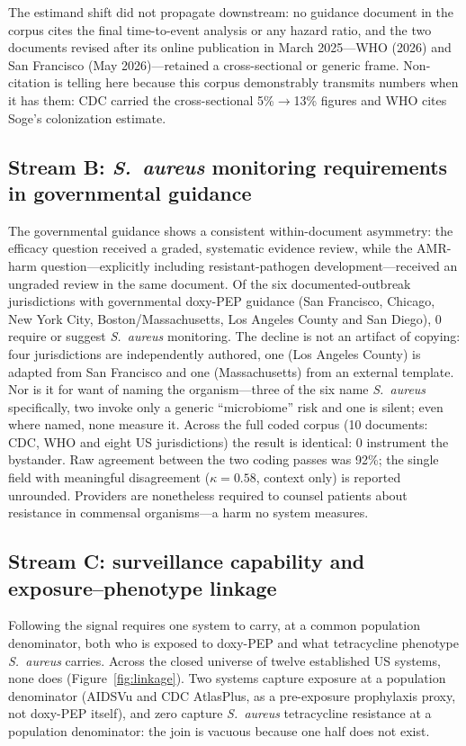 \documentclass[12pt,a4paper]{article}
\newcommand{\sa}{\emph{S.~aureus}}
\begin{document}
The estimand shift did not propagate downstream: no guidance document in the
corpus cites the final time-to-event analysis or any hazard ratio, and the two
documents revised after its online publication in March 2025---WHO (2026) and San
Francisco (May 2026)---retained a cross-sectional or generic frame. Non-citation
is telling here because this corpus demonstrably transmits numbers when it has
them: CDC carried the cross-sectional 5\%$\rightarrow$13\% figures and WHO cites
Soge's colonization estimate.\cite{soge2025}

\subsection*{Stream B: \sa{} monitoring requirements in governmental guidance}
The governmental guidance shows a consistent within-document asymmetry: the
efficacy question received a graded, systematic evidence review, while the
AMR-harm question---explicitly including resistant-pathogen development---received
an ungraded review in the same document. Of the six documented-outbreak
jurisdictions with governmental doxy-PEP guidance (San Francisco, Chicago, New
York City, Boston/Massachusetts, Los Angeles County and San Diego), 0 require or
suggest \sa{} monitoring. The decline is not an artifact of copying: four
jurisdictions are independently authored, one (Los Angeles County) is adapted
from San Francisco and one (Massachusetts) from an external template. Nor is it
for want of naming the organism---three of the six name \sa{} specifically, two
invoke only a generic ``microbiome'' risk and one is silent; even where named,
none measure it. Across the full coded corpus (10 documents: CDC, WHO and eight
US jurisdictions) the result is identical: 0 instrument the bystander. Raw
agreement between the two coding passes was 92\%; the single field with meaningful
disagreement ($\kappa=0.58$, context only) is reported unrounded. Providers are nonetheless required to counsel patients about
resistance in commensal organisms---a harm no system measures.

\subsection*{Stream C: surveillance capability and exposure--phenotype linkage}
Following the signal requires one system to carry, at a common population
denominator, both who is exposed to doxy-PEP and what tetracycline phenotype \sa{}
carries. Across the closed universe of twelve established US systems, none does
(Figure~\ref{fig:linkage}). Two systems capture exposure at a population
denominator (AIDSVu and CDC AtlasPlus, as a pre-exposure prophylaxis proxy, not
doxy-PEP itself),\cite{aidsvu} and zero capture \sa{} tetracycline resistance at a
population denominator: the join is vacuous because one half does not exist.
\end{document}
